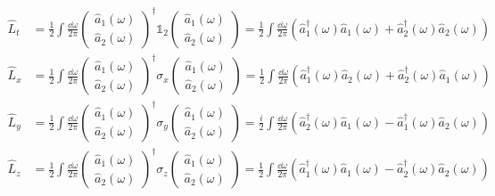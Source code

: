 \begin{align}
	\hat{L}_t
	&=
	\frac{1}{2}
	\int\frac{\dd{\omega}}{2\pi}
	\begin{pmatrix}
		\hat{a}_1(\omega) \\
		\hat{a}_2(\omega)
	\end{pmatrix}^\dagger
	\mathbb{1}_2
	\begin{pmatrix}
		\hat{a}_1(\omega) \\
		\hat{a}_2(\omega)
	\end{pmatrix}
	=
	\frac{1}{2}
	\int\frac{\dd{\omega}}{2\pi}
	\left(
		\hat{a}_1^\dagger(\omega)
		\hat{a}_1(\omega)
		+
		\hat{a}_2^\dagger(\omega)
		\hat{a}_2(\omega)
	\right)
	\\
	\hat{L}_x
	&=
	\frac{1}{2}
	\int\frac{\dd{\omega}}{2\pi}
	\begin{pmatrix}
		\hat{a}_1(\omega) \\
		\hat{a}_2(\omega)
	\end{pmatrix}^\dagger
	\sigma_x
	\begin{pmatrix}
		\hat{a}_1(\omega) \\
		\hat{a}_2(\omega)
	\end{pmatrix}
	=
	\frac{1}{2}
	\int\frac{\dd{\omega}}{2\pi}
	\left(
		\hat{a}_1^\dagger(\omega)
		\hat{a}_2(\omega)
		+
		\hat{a}_2^\dagger(\omega)
		\hat{a}_1(\omega)
	\right)
	\\
	\hat{L}_y
	&=
	\frac{1}{2}
	\int\frac{\dd{\omega}}{2\pi}
	\begin{pmatrix}
		\hat{a}_1(\omega) \\
		\hat{a}_2(\omega)
	\end{pmatrix}^\dagger
	\sigma_y
	\begin{pmatrix}
		\hat{a}_1(\omega) \\
		\hat{a}_2(\omega)
	\end{pmatrix}
	=
	\frac{i}{2}
	\int\frac{\dd{\omega}}{2\pi}
	\left(
		\hat{a}_2^\dagger(\omega)
		\hat{a}_1(\omega)
		-
		\hat{a}_1^\dagger(\omega)
		\hat{a}_2(\omega)
	\right)
	\\
	\hat{L}_z
	&=
	\frac{1}{2}
	\int\frac{\dd{\omega}}{2\pi}
	\begin{pmatrix}
		\hat{a}_1(\omega) \\
		\hat{a}_2(\omega)
	\end{pmatrix}^\dagger
	\sigma_z
	\begin{pmatrix}
		\hat{a}_1(\omega) \\
		\hat{a}_2(\omega)
	\end{pmatrix}
	=
	\frac{1}{2}
	\int\frac{\dd{\omega}}{2\pi}
	\left(
		\hat{a}_1^\dagger(\omega)
		\hat{a}_1(\omega)
		-
		\hat{a}_2^\dagger(\omega)
		\hat{a}_2(\omega)
	\right)
\end{align}
